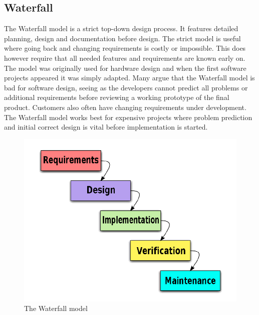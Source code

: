 \subsection{Waterfall}
The Waterfall model is a strict top-down design process. \cite{bib:waterfall}It features detailed planning, design and
documentation before design. The strict model is useful where going back and changing requirements is 
costly or impossible. This does however require that all needed features and requirements are known
early on. The model was originally used for hardware design and when the first software projects 
appeared it was simply adapted. Many argue that the Waterfall model is bad for software design, seeing
as the developers cannot predict all problems or additional requirements before reviewing a working
prototype of the final product. Customers also often have changing requirements under development.
The Waterfall model works best for expensive projects where problem prediction and initial correct design
is vital before implementation is started.
\begin{figure}[h!]
\centering \includegraphics[scale=0.30]{img/designmodel-waterwall} \caption{The Waterfall model}
\label{fig:desigmodel-waterfall}
\end{figure}

